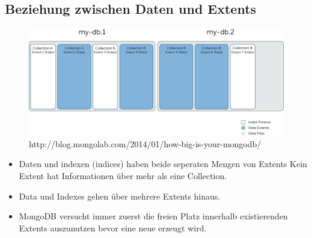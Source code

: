 \documentclass[a4paper,10pt]{scrartcl}
\begin{document}
\subsection{Beziehung zwischen Daten und Extents}
\begin{figure}[h!]
 \centering
 \includegraphics[scale=0.4]{./de.png}
\caption{http://blog.mongolab.com/2014/01/how-big-is-your-mongodb/}
 \end{figure}

\begin{itemize}
 \item Daten und indexen (indices)  haben beide seperaten Mengen von Extents
 \subitem Kein Extent hat Informationen über mehr als eine Collection.
 \item Data und Indexes gehen über mehrere Extents hinaus.
 \item MongoDB versucht immer zuerst die freien Platz innerhalb existierenden Extents auszunutzen bevor eine neue 
erzeugt wird.
\end{itemize}
\end{document}
